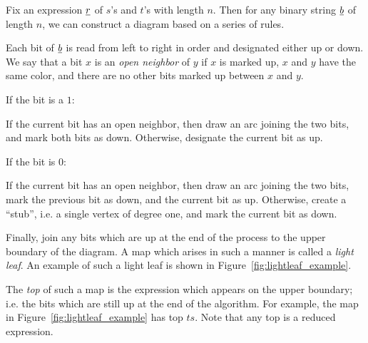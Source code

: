 Fix an expression $\underline{r}$ of $s$'s and $t$'s with length $n$.  Then for any binary string $\underline{b}$ of length $n$, we can construct a diagram based on a series of rules.

Each bit of $\underline{b}$ is read from left to right in order and designated either up or down.  We say that a bit $x$ is an \emph{open neighbor} of $y$ if $x$ is marked up, $x$ and $y$ have the same color, and there are no other bits marked up between $x$ and $y$.
\begin{itemize}
	\ii If the bit is a $1$:
	\begin{itemize}
		\ii If the current bit has an open neighbor, then draw an arc joining the two bits, and mark both bits as down.
		\ii Otherwise, designate the current bit as up.
	\end{itemize}
	\ii If the bit is $0$:
	\begin{itemize}
		\ii If the current bit has an open neighbor, then draw an arc joining the two bits, mark the previous bit as down, and the current bit as up.
		\ii Otherwise, create a ``stub'', i.e. a single vertex of degree one, and mark the current bit as down.
	\end{itemize}
\end{itemize}
Finally, join any bits which are up at the end of the process to the upper boundary of the diagram.  A map which arises in such a manner is called a \emph{light leaf}.  An example of such a light leaf is shown in Figure~\ref{fig:lightleaf_example}.

The \emph{top} of such a map is the expression which appears on the upper boundary; i.e. the bits which are still up at the end of the algorithm.  For example, the map in Figure~\ref{fig:lightleaf_example} has top $ts$.  Note that any top is a reduced expression.  


